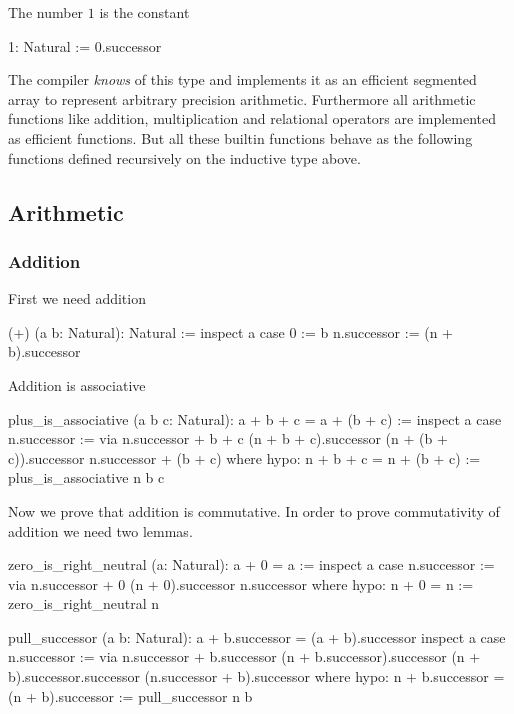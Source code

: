 The number $1$ is the constant

\begin{alba}
  1: Natural := 0.successor
\end{alba}

The compiler \emph{knows} of this type and implements it as an efficient
segmented array to represent arbitrary precision arithmetic. Furthermore all
arithmetic functions like addition, multiplication and relational operators
are implemented as efficient functions. But all these builtin functions behave
as the following functions defined recursively on the inductive type above.





\subsection{Arithmetic}


\subsubsection{Addition}


First we need addition
\begin{alba}
  (+) (a b: Natural): Natural :=
    inspect a case
      0 :=
        b
      n.successor :=
        (n + b).successor
\end{alba}


Addition is associative
%
\begin{alba}
  plus_is_associative (a b c: Natural): a + b + c = a + (b + c) :=
    inspect a case
      n.successor :=
        via
          n.successor + b + c
          (n + b + c).successor
          (n + (b + c)).successor
          n.successor + (b + c)
        where
          hypo: n + b + c = n + (b + c) :=
            plus_is_associative n b c
\end{alba}

Now we prove that addition is commutative. In order to prove commutativity of
addition we need two lemmas.

\begin{alba}
  zero_is_right_neutral (a: Natural): a + 0 = a :=
    inspect a case
      n.successor :=
        via
          n.successor + 0
          (n + 0).successor
          n.successor
        where
          hypo: n + 0 = n := zero_is_right_neutral n
\end{alba}

\begin{alba}
  pull_successor (a b: Natural): a + b.successor = (a + b).successor
    inspect a case
       n.successor :=
         via n.successor + b.successor
             (n + b.successor).successor
             (n + b).successor.successor
             (n.successor + b).successor
         where
           hypo: n + b.successor = (n + b).successor :=
             pull_successor n b
\end{alba}


